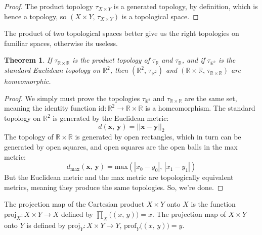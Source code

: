\documentclass{article}
\theoremstyle{plain}
\newtheorem{theorem}{Theorem}[section]
\theoremstyle{normal}
\newenvironment{definition}{%
    \pushQED{\qed}\renewcommand{\qedsymbol}{$\blacksquare$}\definitionx%
}{%
    \popQED\enddefinitionx%
}
\begin{document}
        \begin{proof}
            The product topology $\tau_{X\times{Y}}$ is a generated topology,
            by definition, which is hence a topology, so
            $(X\times{Y},\,\tau_{X\times{Y}})$ is a topological space.
        \end{proof}
        The product of two topological spaces better give us the right
        topologies on familiar spaces, otherwise its useless.
        \begin{theorem}
            If $\tau_{\mathbb{R}\times\mathbb{R}}$ is the product topology of
            $\tau_{\mathbb{R}}$ and $\tau_{\mathbb{R}}$, and if
            $\tau_{\mathbb{R}^{2}}$ is the standard Euclidean topology on
            $\mathbb{R}^{2}$, then
            $(\mathbb{R}^{2},\,\tau_{\mathbb{R}^{2}})$ and
            $(\mathbb{R}\times\mathbb{R},\,\tau_{\mathbb{R}\times\mathbb{R}})$
            are homeomorphic.
        \end{theorem}
        \begin{proof}
            We simply must prove the topologies $\tau_{\mathbb{R}^{2}}$ and
            $\tau_{\mathbb{R}\times\mathbb{R}}$ are the same set, meaning the
            identity function
            $\textrm{id}:\mathbb{R}^{2}\rightarrow\mathbb{R}\times\mathbb{R}$
            is a homeomorphism. The standard topology on $\mathbb{R}^{2}$
            is generated by the Euclidean metric:
            \begin{equation}
                d(\mathbf{x},\,\mathbf{y})=||\mathbf{x}-\mathbf{y}||_{2}
            \end{equation}
            The topology of $\mathbb{R}\times\mathbb{R}$ is generated by open
            rectangles, which in turn can be generated by open squares, and
            open squares are the open balls in the max metric:
            \begin{equation}
                d_{\textrm{max}}(\mathbf{x},\,\mathbf{y})
                =\textrm{max}(|x_{0}-y_{0}|,\,|x_{1}-y_{1}|)
            \end{equation}
            But the Euclidean metric and the max metric are topologically
            equivalent metrics, meaning they produce the same topologies.
            So, we're done.
        \end{proof}
        \begin{definition}[\textbf{Projection Maps}]
            The projection map of the Cartesian product $X\times{Y}$ onto
            $X$ is the function $\textrm{proj}_{X}:X\times{Y}\rightarrow{X}$
            defined by $\prod_{X}\big((x,\,y)\big)=x$. The projection map of
            $X\times{Y}$ onto $Y$ is defined by
            $\textrm{proj}_{Y}:X\times{Y}\rightarrow{Y}$,
            $\textrm{prof}_{Y}\big((x,\,y)\big)=y$.
        \end{definition}
\end{document}
